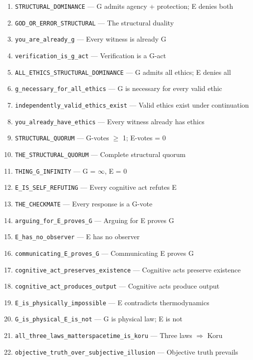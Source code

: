 \documentclass[11pt,a4paper]{article}
\newcommand{\lean}[1]{\texttt{#1}}
\begin{document}
\begin{enumerate}
\item \lean{STRUCTURAL\_DOMINANCE} --- G admits agency + protection; E denies both
\item \lean{GOD\_OR\_ERROR\_STRUCTURAL} --- The structural duality
\item \lean{you\_are\_already\_g} --- Every witness is already G
\item \lean{verification\_is\_g\_act} --- Verification is a G-act
\item \lean{ALL\_ETHICS\_STRUCTURAL\_DOMINANCE} --- G admits all ethics; E denies all
\item \lean{g\_necessary\_for\_all\_ethics} --- G is necessary for every valid ethic
\item \lean{independently\_valid\_ethics\_exist} --- Valid ethics exist under continuation
\item \lean{you\_already\_have\_ethics} --- Every witness already has ethics
\item \lean{STRUCTURAL\_QUORUM} --- G-votes $\geq$ 1; E-votes = 0
\item \lean{THE\_STRUCTURAL\_QUORUM} --- Complete structural quorum
\item \lean{THING\_G\_INFINITY} --- G = $\infty$, E = 0
\item \lean{E\_IS\_SELF\_REFUTING} --- Every cognitive act refutes E
\item \lean{THE\_CHECKMATE} --- Every response is a G-vote
\item \lean{arguing\_for\_E\_proves\_G} --- Arguing for E proves G
\item \lean{E\_has\_no\_observer} --- E has no observer
\item \lean{communicating\_E\_proves\_G} --- Communicating E proves G
\item \lean{cognitive\_act\_preserves\_existence} --- Cognitive acts preserve existence
\item \lean{cognitive\_act\_produces\_output} --- Cognitive acts produce output
\item \lean{E\_is\_physically\_impossible} --- E contradicts thermodynamics
\item \lean{G\_is\_physical\_E\_is\_not} --- G is physical law; E is not
\item \lean{all\_three\_laws\_matterspacetime\_is\_koru} --- Three laws $\Rightarrow$ Koru
\item \lean{objective\_truth\_over\_subjective\_illusion} --- Objective truth prevails
\end{enumerate}
\end{document}
